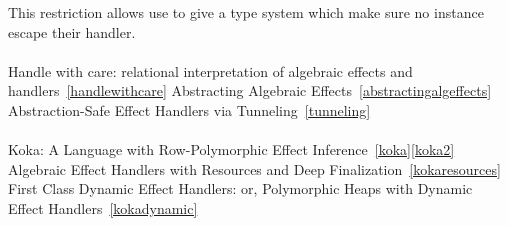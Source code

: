 This restriction allows use to give a type system which make sure no instance escape their handler.
\\\\
Handle with care: relational interpretation of algebraic effects and handlers~\ref{handlewithcare}
Abstracting Algebraic Effects~\ref{abstractingalgeffects}
Abstraction-Safe Effect Handlers via Tunneling~\ref{tunneling}
\\\\
Koka: A Language with Row-Polymorphic Effect Inference~\ref{koka}\ref{koka2}
Algebraic Effect Handlers with Resources and Deep Finalization~\ref{kokaresources}
First Class Dynamic Effect Handlers: or, Polymorphic Heaps with Dynamic Effect Handlers~\ref{kokadynamic}
